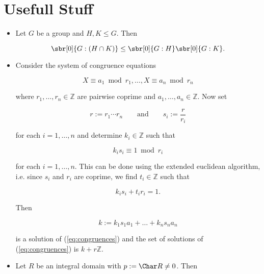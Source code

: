 \section{Usefull Stuff}
\begin{itemize}
	\item Let $G$ be a group and $H,K \leq G$. Then 

		\begin{equation}
			\sbr[0]{G:(H \cap K)} \leq \sbr[0]{G:H} \sbr[0]{G:K}.
		\end{equation}

	\item Consider the system of congruence equations

		\begin{equation}
			X \equiv a_1 \bmod r_1 , \dots , X \equiv a_n \bmod r_n
			\label{eq:congruences}
		\end{equation}

		\noindent where $r_1,\dots,r_n \in \mathbb{Z}$ are pairwise coprime and $a_1,\dots,a_n \in \mathbb{Z}$. Now set 

		\begin{equation}
			r := r_1 \cdots r_n \qquad \text{and} \qquad s_i := \frac{r}{r_i} 
		\end{equation}

		\noindent for each $i = 1,\dots,n$ and determine $k_i \in \mathbb{Z}$ such that 

		\begin{equation}
			k_is_i \equiv 1 \bmod r_i
		\end{equation}

		\noindent for each $i = 1,\dots,n$. This can be done using the extended euclidean algorithm, i.e. since $s_i$ and $r_i$ are coprime, we find $t_i \in \mathbb{Z}$ such that
		
		\begin{equation}
			k_is_i + t_ir_i = 1.
		\end{equation}
		
		Then 

		\begin{equation}
			k := k_1s_1a_1 + \dots + k_ns_na_n
		\end{equation}

		\noindent is a solution of (\ref{eq:congruences}) and the set of solutions of (\ref{eq:congruences}) is $k + r\mathbb{Z}$.

	\item Let $R$ be an integral domain with $p := \Char R \neq 0$. Then 


\end{itemize}
